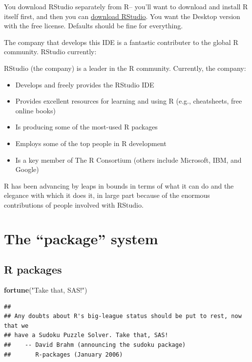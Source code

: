 \documentclass[]{book}
\makeatletter
\newenvironment{Shaded}{\begin{snugshade}}{\end{snugshade}}
\newcommand{\KeywordTok}[1]{\textcolor[rgb]{0.13,0.29,0.53}{\textbf{#1}}}
\newcommand{\StringTok}[1]{\textcolor[rgb]{0.31,0.60,0.02}{#1}}
\newcommand{\NormalTok}[1]{#1}
\providecommand{\tightlist}{%
  \setlength{\itemsep}{0pt}\setlength{\parskip}{0pt}}
\newenvironment{kframe}{%
\medskip{}
\setlength{\fboxsep}{.8em}
 \def\at@end@of@kframe{}%
 \ifinner\ifhmode%
  \def\at@end@of@kframe{\end{minipage}}%
  \begin{minipage}{\columnwidth}%
 \fi\fi%
 \def\FrameCommand##1{\hskip\@totalleftmargin \hskip-\fboxsep
 \colorbox{shadecolor}{##1}\hskip-\fboxsep
     \hskip-\linewidth \hskip-\@totalleftmargin \hskip\columnwidth}%
 \MakeFramed {\advance\hsize-\width
   \@totalleftmargin\z@ \linewidth\hsize
   \@setminipage}}%
 {\par\unskip\endMakeFramed%
 \at@end@of@kframe}
\renewenvironment{Shaded}{\begin{kframe}}{\end{kframe}}
\theoremstyle{definition}
\theoremstyle{definition}
\theoremstyle{definition}
\theoremstyle{remark}
\makeatother
\begin{document}
You download RStudio separately from R-- you'll want to download and
install R itself first, and then you can
\href{https://www.rstudio.com/products/rstudio/download2/}{download
RStudio}. You want the Desktop version with the free license. Defaults
should be fine for everything.

The company that develops this IDE is a fantastic contributer to the
global R community. RStudio currently:

RStudio (the company) is a leader in the R community. Currently, the
company:

\begin{itemize}
\tightlist
\item
  Develops and freely provides the RStudio IDE
\item
  Provides excellent resources for learning and using R (e.g.,
  cheatsheets, free online books)
\item
  Is producing some of the most-used R packages
\item
  Employs some of the top people in R development
\item
  Is a key member of The R Consortium (others include Microsoft, IBM,
  and Google)
\end{itemize}

R has been advancing by leaps in bounds in terms of what it can do and
the elegance with which it does it, in large part because of the
enormous contributions of people involved with RStudio.

\section{\texorpdfstring{The ``package''
system}{The package system}}\label{the-package-system}

\subsection{R packages}\label{r-packages}

\begin{Shaded}
\begin{Highlighting}[]
\KeywordTok{fortune}\NormalTok{(}\StringTok{"Take that, SAS!"}\NormalTok{)}
\end{Highlighting}
\end{Shaded}

\begin{verbatim}
## 
## Any doubts about R's big-league status should be put to rest, now that we
## have a Sudoku Puzzle Solver. Take that, SAS!
##    -- David Brahm (announcing the sudoku package)
##       R-packages (January 2006)
\end{verbatim}
\end{document}
